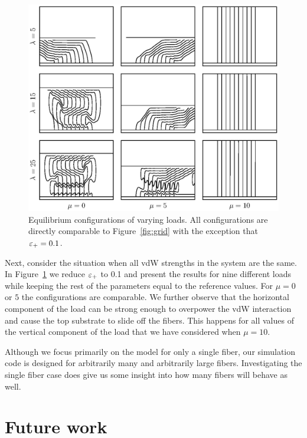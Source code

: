 	\begin{figure}
		\begin{center}
			\includegraphics[scale=1]{./fig/ch4/grid_et0.1.eps}
		\end{center}		
		\caption{Equilibrium configurations of varying loads. All configurations are directly comparable to Figure~\ref{fig:grid} with the exception that $\varepsilon_+ = 0.1$.
		\label{fig:grid_et0.1}}
	\end{figure}

\enlargethispage{\baselineskip}
Next, consider the situation when all vdW strengths in the system are the same. In Figure~\ref{fig:grid_et0.1} we reduce $\varepsilon_+$ to 0.1 and present the results for nine different loads while keeping the rest of the parameters equal to the reference values. For $\mu = 0$ or $5$ the configurations are comparable. We further observe that the horizontal component of the load can be strong enough to overpower the vdW interaction and cause the top substrate to slide off the fibers. This happens for all values of the vertical component of the load that we have considered when $\mu = 10$.
	
	Although we focus primarily on the model for only a single fiber, our simulation code is designed for arbitrarily many and arbitrarily large fibers. Investigating the single fiber case does give us some insight into how many fibers will behave as well.

\section{Future work}

